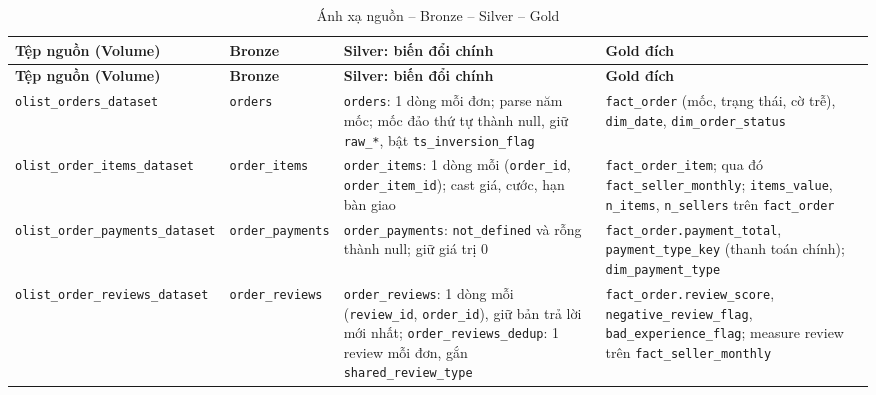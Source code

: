 \documentclass[a4paper]{article}
\begin{document}
{\footnotesize
\setlength{\tabcolsep}{3pt}
\renewcommand{\arraystretch}{1.12}
\begin{longtable}{@{}>{\raggedright\arraybackslash}p{3.0cm}>{\raggedright\arraybackslash}p{2.6cm}>{\raggedright\arraybackslash}p{5.4cm}>{\raggedright\arraybackslash}p{5.2cm}@{}}
\caption{Ánh xạ nguồn -- Bronze -- Silver -- Gold}\label{tab:pl_s2t}\\
\toprule
\textbf{Tệp nguồn (Volume)} & \textbf{Bronze} & \textbf{Silver: biến đổi chính} & \textbf{Gold đích} \\
\midrule
\endfirsthead
\toprule
\textbf{Tệp nguồn (Volume)} & \textbf{Bronze} & \textbf{Silver: biến đổi chính} & \textbf{Gold đích} \\
\midrule
\endhead
\bottomrule
\endfoot
\texttt{olist\_\allowbreak{}orders\_\allowbreak{}dataset} & \texttt{orders} & \texttt{orders}: 1 dòng mỗi đơn; parse năm mốc; mốc đảo thứ tự thành null, giữ \texttt{raw\_\allowbreak{}*}, bật \texttt{ts\_\allowbreak{}inversion\_\allowbreak{}flag} & \texttt{fact\_\allowbreak{}order} (mốc, trạng thái, cờ trễ), \texttt{dim\_\allowbreak{}date}, \texttt{dim\_\allowbreak{}order\_\allowbreak{}status} \\
\addlinespace
\texttt{olist\_\allowbreak{}order\_\allowbreak{}items\_\allowbreak{}dataset} & \texttt{order\_\allowbreak{}items} & \texttt{order\_\allowbreak{}items}: 1 dòng mỗi (\texttt{order\_\allowbreak{}id}, \texttt{order\_\allowbreak{}item\_\allowbreak{}id}); cast giá, cước, hạn bàn giao & \texttt{fact\_\allowbreak{}order\_\allowbreak{}item}; qua đó \texttt{fact\_\allowbreak{}seller\_\allowbreak{}monthly}; \texttt{items\_\allowbreak{}value}, \texttt{n\_\allowbreak{}items}, \texttt{n\_\allowbreak{}sellers} trên \texttt{fact\_\allowbreak{}order} \\
\addlinespace
\texttt{olist\_\allowbreak{}order\_\allowbreak{}payments\_\allowbreak{}dataset} & \texttt{order\_\allowbreak{}payments} & \texttt{order\_\allowbreak{}payments}: \texttt{not\_\allowbreak{}defined} và rỗng thành null; giữ giá trị 0 & \texttt{fact\_\allowbreak{}order.payment\_\allowbreak{}total}, \texttt{payment\_\allowbreak{}type\_\allowbreak{}key} (thanh toán chính); \texttt{dim\_\allowbreak{}payment\_\allowbreak{}type} \\
\addlinespace
\texttt{olist\_\allowbreak{}order\_\allowbreak{}reviews\_\allowbreak{}dataset} & \texttt{order\_\allowbreak{}reviews} & \texttt{order\_\allowbreak{}reviews}: 1 dòng mỗi (\texttt{review\_\allowbreak{}id}, \texttt{order\_\allowbreak{}id}), giữ bản trả lời mới nhất; \texttt{order\_\allowbreak{}reviews\_\allowbreak{}dedup}: 1 review mỗi đơn, gắn \texttt{shared\_\allowbreak{}review\_\allowbreak{}type} & \texttt{fact\_\allowbreak{}order.review\_\allowbreak{}score}, \texttt{negative\_\allowbreak{}review\_\allowbreak{}flag}, \texttt{bad\_\allowbreak{}experience\_\allowbreak{}flag}; measure review trên \texttt{fact\_\allowbreak{}seller\_\allowbreak{}monthly} \\

\end{longtable}}
\end{document}

